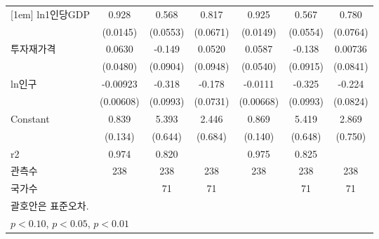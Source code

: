 \begin{table}[htbp]
{\begin{tabular}{l*{6}{c}}
[1em]
ln1인당GDP        &       0.928\sym{***}&       0.568\sym{***}&       0.817\sym{***}&       0.925\sym{***}&       0.567\sym{***}&       0.780\sym{***}\\
                    &    (0.0145)         &    (0.0553)         &    (0.0671)         &    (0.0149)         &    (0.0554)         &    (0.0764)         \\
[1em]
투자재가격        &      0.0630         &      -0.149         &      0.0520         &      0.0587         &      -0.138         &     0.00736         \\
                    &    (0.0480)         &    (0.0904)         &    (0.0948)         &    (0.0540)         &    (0.0915)         &    (0.0841)         \\
[1em]
ln인구            &    -0.00923         &      -0.318\sym{***}&      -0.178\sym{**} &     -0.0111\sym{*}  &      -0.325\sym{***}&      -0.224\sym{***}\\
                    &   (0.00608)         &    (0.0993)         &    (0.0731)         &   (0.00668)         &    (0.0993)         &    (0.0824)         \\
[1em]
Constant            &       0.839\sym{***}&       5.393\sym{***}&       2.446\sym{***}&       0.869\sym{***}&       5.419\sym{***}&       2.869\sym{***}\\
                    &     (0.134)         &     (0.644)         &     (0.684)         &     (0.140)         &     (0.648)         &     (0.750)         \\
\hline
r2                  &       0.974         &       0.820         &                     &       0.975         &       0.825         &                     \\
관측수                   &         238         &         238         &         238         &         238         &         238         &         238         \\
국가수                 &                     &          71         &          71         &                     &          71         &          71         \\
\hline\hline
\multicolumn{7}{l}{\footnotesize 괄호안은 표준오차.}\\
\multicolumn{7}{l}{\footnotesize \sym{*} \(p<0.10\), \sym{**} \(p<0.05\), \sym{***} \(p<0.01\)}\\
\end{tabular}}
\end{table}